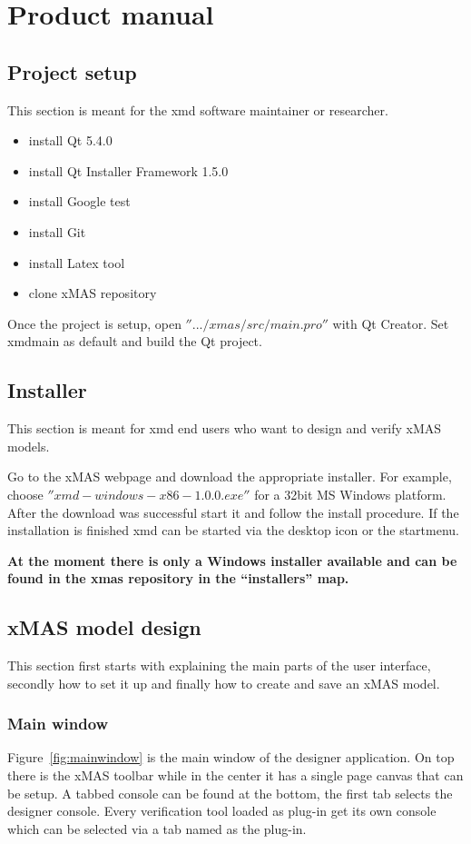 \chapter{Product manual}

\section{Project setup}
This section is meant for the xmd software maintainer or researcher.

\begin{itemize}
\item install Qt 5.4.0
\item install Qt Installer Framework 1.5.0
\item install Google test
\item install Git
\item install Latex tool
\item clone xMAS repository
\end{itemize}

Once the project is setup, open $''.../xmas/src/main.pro''$ with Qt Creator.
Set xmdmain as default and build the Qt project.

\section{Installer}
This section is meant for xmd end users who want to design and verify xMAS models.

Go to the xMAS webpage and download the appropriate installer. For example,
choose $''xmd-windows-x86-1.0.0.exe''$ for a 32bit MS Windows platform. After
the download was successful start it and follow the install procedure.
If the installation is finished xmd can be started via the desktop icon or the startmenu.

\begin{tcolorbox}[colback=white]
\textbf{
At the moment there is only a Windows installer available and can be found in
the xmas repository in the ``installers'' map.
}
\end{tcolorbox}

\section{xMAS model design}
This section first starts with explaining the main parts of the user interface,
secondly how to set it up and finally how to create and save an xMAS model.

\subsection{Main window}
Figure~\ref{fig:mainwindow} is the main window of the designer application. On
top there is the xMAS toolbar while in the center it has a single page canvas
that can be setup. A tabbed console can be found at the bottom, the first tab
selects the designer console. Every verification tool loaded as plug-in get its
own console which can be selected via a tab named as the plug-in.

